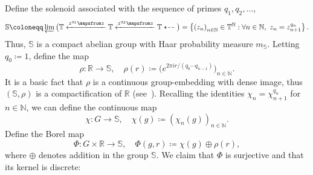 \documentclass{amsart}
\numberwithin{equation}{subsection}
\theoremstyle{remark}
\begin{document}
Define the solenoid associated with the sequence of primes \(q_{1},q_{2},\dotsc\),
\[\mathbb{S}\coloneqq \varprojlim\big(\mathbb{T}\xleftarrow{z^{q_{1}}\mapsfrom z}\mathbb{T}\xleftarrow{z^{q_{2}}\mapsfrom z}\mathbb{T}\dashleftarrow\big)=\left\{ \left(z_{n}\right)_{n\in\mathbb{N}}\in\mathbb{T}^{\mathbb{N}}:\forall n\in\mathbb{N},\,\,z_{n}=z_{n+1}^{q_{n}}\right\}.\]
Thus, \(\mathbb{S}\) is a compact abelian group with Haar probability measure \(m_{\mathbb{S}}\). Letting \(q_{0}\coloneqq 1\), define the map
\[\rho:\mathbb{R}\longrightarrow\mathbb{S},\quad\rho\left(r\right)\coloneqq\big(e^{2\pi ir/\left(q_{0}\dotsm q_{n-1}\right)}\big)_{n\in\mathbb{N}}.\]
It is a basic fact that \(\rho\) is a continuous group-embedding with dense image, thus \(\left(\mathbb{S},\rho\right)\) is a compactification of \(\mathbb{R}\) (see~\cite[(25.3)]{HewittRoss}). Recalling the identities \(\chi_{n}=\chi_{n+1}^{q_{n}}\) for \(n\in\mathbb{N}\), we can define the continuous map
\[\chi:G\longrightarrow\mathbb{S},\quad\chi\left(g\right)\coloneqq\left(\chi_{n}\left(g\right)\right)_{n\in\mathbb{N}}.\]
Define the Borel map
\[\Phi:G\times\mathbb{R}\longrightarrow\mathbb{S},\quad\Phi\left(g,r\right)\coloneqq\chi\left(g\right)\oplus\rho\left(r\right),\]
where \(\oplus\) denotes addition in the group \(\mathbb{S}\). We claim that \(\Phi\) is surjective and that its kernel is discrete:
\end{document}
